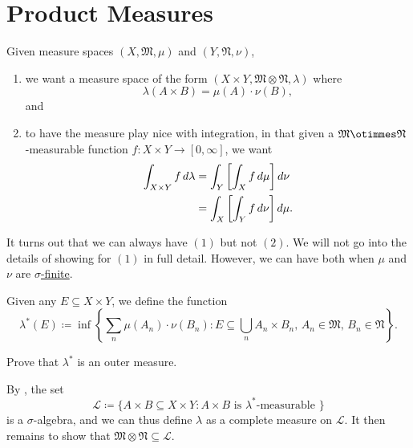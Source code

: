 \documentclass[notoc,notitlepage]{tufte-book}
\begin{document}

\section{Product Measures}%
\label{sec:product_measures}

\begin{note}
  Given measure spaces $(X, \mathfrak{M}, \mu)$ and $(Y, \mathfrak{N}, \nu)$,
  \begin{enumerate}
    \item we want a measure space of the form $(X \times Y, \mathfrak{M} \otimes
      \mathfrak{N}, \lambda)$ where
      \begin{equation*}
        \lambda(A \times B) = \mu(A) \cdot \nu(B),
      \end{equation*}
      and
    \item to have the measure play nice with integration, in that
      given a $\mathfrak{M} \otimmes \mathfrak{N}$-measurable function
      $f : X \times Y \to [0, \infty]$, we want
      \begin{align*}
        \int_{X \times Y} f \mathop{}\!d{\lambda}
        &= \int_{Y} \left[ \int_{X} f \mathop{}\!d{\mu} \right] \mathop{}\!d{\nu} \\
        &= \int_{X} \left[ \int_{Y} f \mathop{}\!d{\nu} \right] \mathop{}\!d{\mu}.
      \end{align*}
  \end{enumerate}
  It turns out that we can always have $(1)$ but not $(2)$.
  We will not go into the details of showing for $(1)$ in full detail.
  However, we can have both when $\mu$ and $\nu$ are
  \hyperref[defn:finitivity_sigma_finitivity_and_semi_finitivity_of_a_measure]{$\sigma$-finite}.
\end{note}

\begin{note}
  Given any $E \subseteq X \times Y$, we define the function
  \begin{equation*}
    \lambda^*(E) \coloneqq \inf \left\{ 
      \sum_n \mu(A_n) \cdot \nu(B_n)
        : E \subseteq \bigcup_n A_n \times B_n,\,
          A_n \in \mathfrak{M},\, B_n \in \mathfrak{N}
    \right\}.
  \end{equation*}
  \begin{ex}
    Prove that $\lambda^*$ is an outer measure.
  \end{ex}
  By , the set
  \begin{equation*}
    \mathcal{L} \coloneqq \{ A \times B \subseteq X \times Y
        : A \times B \text{ is } \lambda^*\text{-measurable } \}
  \end{equation*}
  is a $\sigma$-algebra, and we can thus define
  $\lambda$ as a complete measure on $\mathcal{L}$.
  It then remains to show that
  $\mathfrak{M} \otimes \mathfrak{N} \subseteq \mathcal{L}$.
\end{note}
\end{document}
